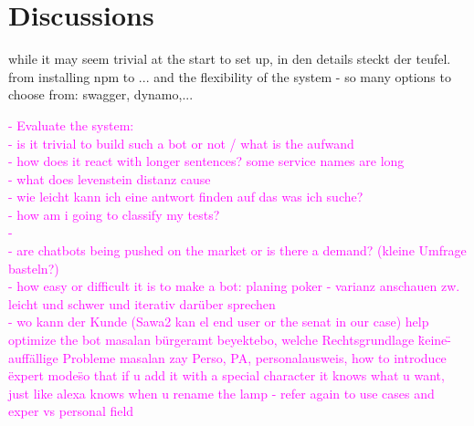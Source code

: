 \section{Discussions}
\label{discussions}




while it may seem trivial at the start to set up, in den details steckt der teufel. from installing npm to ... and the flexibility of the system - so many options to choose from: swagger, dynamo,...



\textcolor{magenta}{
- Evaluate the system:\\
- is it trivial to build such a bot or not / what is the aufwand\\
- how does it react with longer sentences? some service names are long\\
- what does levenstein distanz cause\\
- wie leicht kann ich eine antwort finden auf das was ich suche?\\
- how am i going to classify my tests?\\
-\\
- are chatbots being pushed on the market or is there a demand? (kleine Umfrage basteln?)\\
- how easy or difficult it is to make a bot: planing poker - varianz anschauen zw. leicht und schwer und iterativ darüber sprechen\\
-	wo kann der Kunde (Sawa2 kan el end user or the senat in our case) help optimize the bot
masalan bürgeramt beyektebo, welche Rechtsgrundlage \"keine\"
-	auff\"{a}llige Probleme
masalan zay Perso, PA, personalausweis, how to introduce \"expert mode\" so that if u add it with a special character it knows what u want, just like alexa knows when u rename the lamp - refer again to use cases and exper vs personal field
}

